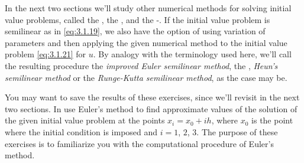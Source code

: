 In the next two sections we'll study other numerical methods for
solving initial value problems,  called the
, the ,
and the
-.
 If the initial value problem is semilinear as
in \eqref{eq:3.1.19},  we also have the option of using variation of
parameters and then applying the given numerical method to the initial
value problem \eqref{eq:3.1.21} for $u$. By analogy with the terminology
used here, we'll call the resulting procedure
the \emph{\color{blue}improved Euler semilinear method},
the ,
\emph{\color{blue}Heun's semilinear method} or the
\emph{\color{blue}Runge-Kutta semilinear method}, as
the case may be.

\exercises
 You may want to save the results of these
exercises, since we'll revisit in the next two
sections.
In  use Euler's method to find
approximate values of the solution of the given initial value problem
at the points $x_i=x_0+ih$, where $x_0$ is the point where the
initial condition is imposed and $i=1$, $2$, $3$. The purpose of these
exercises is to familiarize you with the computational procedure of
Euler's method.

